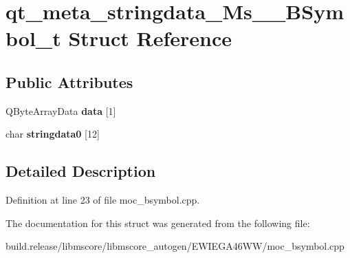 \hypertarget{structqt__meta__stringdata___ms_____b_symbol__t}{}\section{qt\+\_\+meta\+\_\+stringdata\+\_\+\+Ms\+\_\+\+\_\+\+B\+Symbol\+\_\+t Struct Reference}
\label{structqt__meta__stringdata___ms_____b_symbol__t}
\subsection*{Public Attributes}
\begin{DoxyCompactItemize}
\item 
\mbox{\label{structqt__meta__stringdata___ms_____b_symbol__t_afd4e9d87d1d966b6228b932e92314ae8}} 
Q\+Byte\+Array\+Data {\bfseries data} \mbox{[}1\mbox{]}
\item 
\mbox{\label{structqt__meta__stringdata___ms_____b_symbol__t_aabe047b58792f1d975bdfe595b35e3c0}} 
char {\bfseries stringdata0} \mbox{[}12\mbox{]}
\end{DoxyCompactItemize}


\subsection{Detailed Description}


Definition at line 23 of file moc\+\_\+bsymbol.\+cpp.



The documentation for this struct was generated from the following file\+:\begin{DoxyCompactItemize}
\item 
build.\+release/libmscore/libmscore\+\_\+autogen/\+E\+W\+I\+E\+G\+A46\+W\+W/moc\+\_\+bsymbol.\+cpp\end{DoxyCompactItemize}
